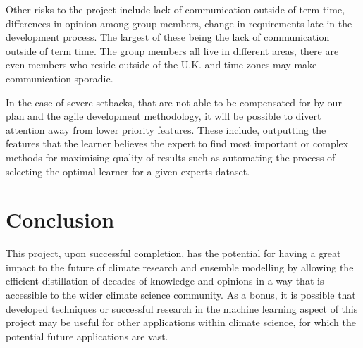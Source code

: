 \documentclass{ecmm427_assignment}
\begin{document}
 Other risks to the project include lack of communication outside of term time, differences in opinion among group members, change in requirements late in the development process. The largest of these being the lack of communication outside of term time. The group members all live in different areas, there are even members who reside outside of the U.K. and time zones may make communication sporadic. 

In the case of severe setbacks, that are not able to be compensated for by our plan and the agile development methodology, it will be possible to divert attention away from lower priority features. These include, outputting the features that the learner believes the expert to find most important or complex methods for maximising quality of results such as automating the process of selecting the optimal learner for a given experts dataset.
 
 \section{Conclusion}
 
 This project, upon successful completion, has the potential for having a great impact to the future of climate research and ensemble modelling by allowing the efficient distillation of decades of knowledge and opinions in a way that is accessible to the wider climate science community. As a bonus, it is possible that developed techniques or successful research in the machine learning aspect of this project may be useful for other applications within climate science, for which the potential future applications are vast.


\end{document}
